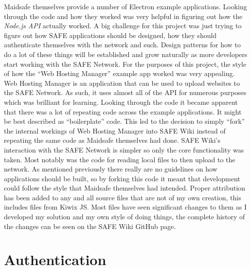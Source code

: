 Maidsafe themselves provide a number of Electron example applications\cite{example-apps}. Looking through the code and how they worked was very helpful in figuring out how the \textit{Node.js API} actually worked. A big challenge for this project was just trying to figure out how SAFE applications should be designed, how they should authenticate themselves with the network and such. Design patterns for how to do a lot of these things will be established and grow naturally as more developers start working with the SAFE Network. For the purposes of this project, the style of how the ``Web Hosting Manager''\cite{web-hosting-manager} example app worked was very appealing. Web Hosting Manager is an application that can be used to upload websites to the SAFE Network. As such, it uses almost all of the API for numerous purposes which was brilliant for learning. Looking through the code it became apparent that there was a lot of repeating code across the example applications. It might be best described as ``boilerplate'' code. This led to the decision to simply ``fork'' the internal workings of Web Hosting Manager into SAFE Wiki instead of repeating the same code as Maidsafe themselves had done. SAFE Wiki's interaction with the SAFE Network is simpler so only the core functionality was taken. Most notably was the code for reading local files to then upload to the network. As mentioned previously there really are no guidelines on how applications should be built, so by forking this code it meant that development could follow the style that Maidsafe themselves had intended. Proper attribution has been added to any and all source files that are not of my own creation, this includes files from Kiwix JS. Most files have seen significant changes to them as I developed my solution and my own style of doing things, the complete history of the changes can be seen on the SAFE Wiki GitHub page.

\section{Authentication}

